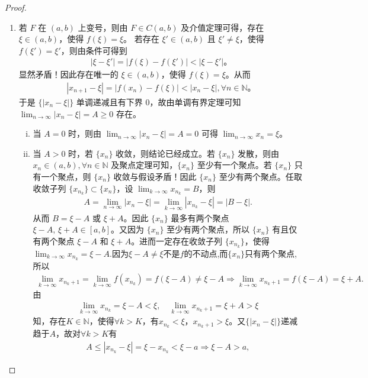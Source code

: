 \documentclass[../../main.tex]{subfiles}
\begin{document}
\begin{proof}
\begin{enumerate}[(1)]
\item 若 $F$ 在 $(a, b)$ 上变号，则由 $F \in C(a, b)$ 及介值定理可得，存在 $\xi \in (a, b)$，使得 $f(\xi) = \xi$。
若存在 $\xi' \in (a, b)$ 且 $\xi' \neq \xi$，使得 $f(\xi') = \xi'$，则由条件可得到
\begin{align*}
|\xi - \xi'| = |f(\xi) - f(\xi')| < |\xi - \xi'|。
\end{align*}
显然矛盾！因此存在唯一的 $\xi \in (a, b)$，使得 $f(\xi) = \xi$。从而
\begin{align*}
|x_{n+1} - \xi| = |f(x_n) - f(\xi)| < |x_n - \xi|, \forall n \in \mathbb{N}。
\end{align*}
于是 $\{|x_n - \xi|\}$ 单调递减且有下界 $0$，故由单调有界定理可知 $\lim_{n \to \infty} |x_n - \xi| = A \geqslant 0$ 存在。
\begin{enumerate}[(i)]
\item 当 $A = 0$ 时，则由 $\lim_{n \to \infty} |x_n - \xi| = A = 0$ 可得 $\lim_{n \to \infty} x_n = \xi$。
\item 当 $A > 0$ 时，若 $\{x_n\}$ 收敛，则结论已经成立。若 $\{x_n\}$ 发散，则由 $x_n \in (a, b), \forall n \in \mathbb{N}$ 及聚点定理可知，$\{x_n\}$ 至少有一个聚点。若 $\{x_n\}$ 只有一个聚点，则 $\{x_n\}$ 收敛与假设矛盾！因此 $\{x_n\}$ 至少有两个聚点。任取收敛子列 $\{x_{n_k}\} \subset \{x_n\}$，设 $\lim_{k \to \infty} x_{n_k} = B$，则
\begin{align*}
A=\lim_{n\rightarrow \infty} |x_n-\xi |=\lim_{k\rightarrow \infty} |x_{n_k}-\xi |=|B-\xi |.
\end{align*}
从而 $B = \xi - A$ 或 $\xi + A$。因此 $\{x_n\}$ 最多有两个聚点 $\xi - A,\,\xi + A\in [a,b]$。又因为 $\{x_n\}$ 至少有两个聚点，所以 $\{x_n\}$ 有且仅有两个聚点 $\xi - A$ 和 $\xi + A$。进而一定存在收敛子列 $\{x_{n_k}\}$，使得$\lim_{k \to \infty} x_{n_k} = \xi - A.$因为$\xi-A\ne \xi$不是$f$的不动点,而$\{x_n\}$只有两个聚点,所以
\begin{align*}
\lim_{k\rightarrow \infty} x_{n_k+1}=\lim_{k\rightarrow \infty} f\left( x_{n_k} \right) =f\left( \xi -A \right) \ne \xi -A\Longrightarrow \lim_{k\rightarrow \infty} x_{n_k+1}=f(\xi -A)=\xi +A.
\end{align*}
由
\begin{align*}
\lim_{k\rightarrow \infty}x_{n_k}=\xi -A<\xi ,\quad \lim_{k\rightarrow \infty}x_{n_k+1}=\xi +A>\xi 
\end{align*}
知，存在$K\in \mathbb{N}$，使得$\forall k>K$，有$x_{n_k}<\xi$，$x_{n_k+1}>\xi$。又$\{| x_n-\xi |\}$递减趋于$A$，故对$\forall k>K$有
\begin{gather*}
A\leqslant | x_{n_k}-\xi |=\xi -x_{n_k}<\xi -a\Longrightarrow \xi -A>a,

\end{gather*}
\end{enumerate}
\end{enumerate}
\end{proof}
\end{document}
